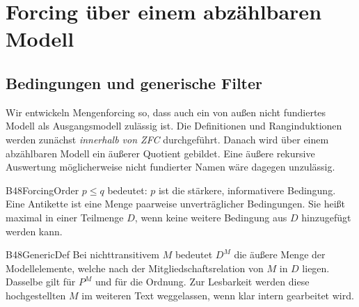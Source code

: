 \section{Forcing über einem abzählbaren Modell}

\subsection{Bedingungen und generische Filter}

Wir entwickeln Mengenforcing so, dass auch ein von außen nicht
fundiertes Modell als Ausgangsmodell zulässig ist. Die Definitionen
und Ranginduktionen werden zunächst \emph{innerhalb von ZFC}
durchgeführt. Danach wird über einem abzählbaren Modell ein äußerer
Quotient gebildet. Eine äußere rekursive Auswertung möglicherweise
nicht fundierter Namen wäre dagegen unzulässig.

{B48ForcingOrder}{
}
\noindent
\(p\le q\) bedeutet: \(p\) ist die stärkere, informativere Bedingung.
Eine Antikette ist eine Menge paarweise unverträglicher Bedingungen.
Sie heißt maximal in einer Teilmenge \(D\), wenn keine weitere
Bedingung aus \(D\) hinzugefügt werden kann.

{B48GenericDef}{
}
\noindent
Bei nichttransitivem \(M\) bedeutet \(D^M\) die äußere Menge der
Modellelemente, welche nach der Mitgliedschaftsrelation von \(M\)
in \(D\) liegen. Dasselbe gilt für \(P^M\) und für die Ordnung.
Zur Lesbarkeit werden diese hochgestellten \(M\) im weiteren Text
weggelassen, wenn klar intern gearbeitet wird.

